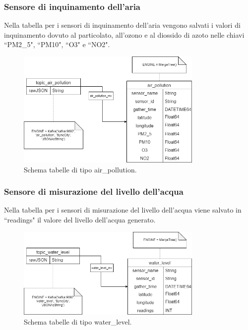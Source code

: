 \documentclass[8pt]{article}
\begin{document}
\subsubsection{Sensore di inquinamento dell'aria}
Nella tabella per i sensori di inquinamento dell'aria vengono salvati i valori di inquinamento dovuto al particolato, all'ozono e al diossido di azoto nelle chiavi ``PM2\_5", ``PM10", ``O3" e ``NO2".
\begin{figure}[h!]
    \centering
    \includegraphics[width=0.8\textwidth]{images_st/tabelle_air_pollution.png}
    \caption{Schema tabelle di tipo air\_pollution.}
    \label{fig:Schema tabelle di tipo air_pollution}
\end{figure}
\subsubsection{Sensore di misurazione del livello dell'acqua}
Nella tabella per i sensori di misurazione del livello dell'acqua viene salvato in ``readings" il valore del livello dell'acqua generato.
\begin{figure}[h!]
    \centering
    \includegraphics[width=0.8\textwidth]{images_st/tabelle_water_level.png}
    \caption{Schema tabelle di tipo water\_level.}
    \label{fig:Schema tabelle di tipo water_level}
\end{figure}
\clearpage
\end{document}
